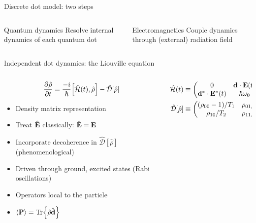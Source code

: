 \documentclass[aspectratio=169, usenames, dvipsnames]{beamer}
\begin{document}
\begin{frame}{Discrete dot model: two steps}
  \begin{columns}
    \begin{column}{0.5\textwidth}
      \begin{block}{Quantum dynamics}
        Resolve internal dynamics of each quantum dot 
      \end{block}
    \end{column}

    \begin{column}{0.5\textwidth}
      \begin{block}{Electromagnetics}
        Couple dynamics through (external) radiation field 
      \end{block}
    \end{column}
  \end{columns}
\end{frame}

\begin{frame}{Independent dot dynamics: the Liouville equation}
  \begin{columns}
    \begin{column}{0.5\textwidth}
      \begin{equation*}
          \pdv{\hat{\rho}}{t} = \frac{-i}{\hbar} \commutator{\hat{\mathcal{H}}(t)}{\hat{\rho}} - \hat{\mathcal{D}}\qty[\hat{\rho}]
        \end{equation*}
        \begin{itemize}
          \item Density matrix representation %
          \item Treat $\hat{\vb{E}}$ classically: $\hat{\vb{E}} = \vb{E}$
          \item Incorporate decoherence in $\hat{\mathcal{D}}[\hat{\rho}]$ (phenomenological)
          \item Driven through ground, excited states (Rabi oscillations)
          \item Operators local to the particle
          \item $\expval{\vb{P}} = \Tr{\hat{\rho} \hat{\vb{d}}}$
        \end{itemize}
    \end{column}
    \begin{column}{0.5\textwidth}
      
      \vspace{-0.6cm}
      \begin{align*}
        \hat{\mathcal{H}}(t) &\equiv \mqty(0 & \vb{d} \cdot \vb{E}(t) \\ \vb{d}^* \cdot \vb{E}^*(t) & \hbar \omega_0) \\
        \hat{\mathcal{D}}[\hat{\rho}] &\equiv \mqty( (\rho_{00} - 1)/T_1 & \rho_{01}/T_2 \\ \rho_{10}/T_2 & \rho_{11}/T_1)
      \end{align*}
    \end{column}
  \end{columns}
\end{frame}
\end{document}
